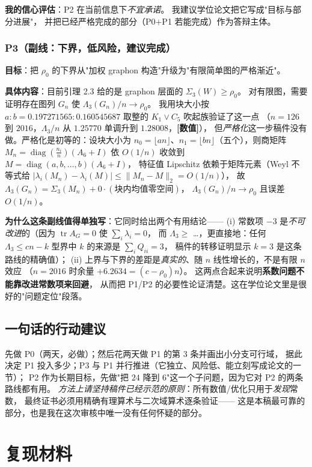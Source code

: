 \documentclass[UTF8,11pt]{ctexart}
\theoremstyle{definition}
\newcommand{\tr}{\operatorname{tr}}
\newcommand{\diag}{\operatorname{diag}}
\newcommand{\num}{\textcolor[rgb]{0.55,0.35,0.00}{\bfseries [数值]}}
\begin{document}
\textbf{我的信心评估}：P2 在当前信息下\emph{不宜承诺}。
我建议学位论文把它写成"目标与部分进展"，
并把已经严格完成的部分（P0$+$P1 若能完成）作为答辩主体。

\subsubsection*{P3（副线：下界，低风险，建议完成）}
\textbf{目标}：把 $\rho_0$ 的下界从"加权 graphon 构造"升级为"有限简单图的严格渐近"。

\textbf{具体内容}：目前引理 2.3 给的是 graphon 层面的 $\Sigma_3(W)\ge\rho_0$。
对有限图，需要证明存在图列 $G_n$ 使 $\Lambda_3(G_n)/n\to\rho_0$。
我用块大小按 $a:b=0.197271565:0.160545687$ 取整的 $K_1\vee C_5$ 吹起族验证了这一点
（$n=126$ 到 $2016$，$\Lambda_3/n$ 从 $1.25770$ 单调升到 $1.28008$，\num），
但\emph{严格化}这一步稿件没有做。严格化是初等的：设块大小为
$n_0=\lfloor an\rfloor$、$n_1=\lfloor bn\rfloor$（五个），则商矩阵
$M_n=\diag(\frac{n_i}n)(A_6+I)$ 依 $O(1/n)$ 收敛到 $M=\diag(a,b,\ldots,b)(A_6+I)$，
特征值 Lipschitz 依赖于矩阵元素（Weyl 不等式给 $|\lambda_i(M_n)-\lambda_i(M)|\le\|M_n-M\|_2=O(1/n)$），
故 $\Lambda_3(G_n)=\Sigma_3(M_n)+0\cdot(\text{块内均值零空间})$，
$\Lambda_3(G_n)/n\to\rho_0$ 且误差 $O(1/n)$。

\textbf{为什么这条副线值得单独写}：它同时给出两个有用结论——
(i) 常数项 $-3$ 是\emph{不可改进}的（因为 $\tr A_G=0$ 使 $\sum_i\lambda_i=0$，
而 $\Lambda_3\ge$ …，更直接地：任何 $\Lambda_3\le cn-k$ 型界中 $k$ 的来源是 $\sum_iQ_{ii}=3$，
稿件的转移证明显示 $k=3$ 是这条路线的精确值）；
(ii) 上界与下界的差距是\emph{真实的}、随 $n$ 线性增长的，不是有限 $n$ 效应
（$n=2016$ 时余量 $+6.2634=(c-\rho_0)n$）。
这两点合起来说明\textbf{系数问题不能靠改进常数项来回避}，
从而把 P1/P2 的必要性论证清楚。这在学位论文里是很好的"问题定位"段落。

\subsection{一句话的行动建议}

先做 P0（两天，必做）；然后花两天做 P1 的第 3 条并画出小分支可行域，
据此决定 P1 投入多少；P3 与 P1 并行推进（它独立、风险低、能立刻写成论文的一节）；
P2 作为长期目标，先做"把 $24$ 降到 $6$"这一个子问题，因为它对 P2 的两条路线都有用。
\emph{方法上请坚持稿件已经示范的原则}：所有数值/优化只用于\emph{发现}常数，
最终证书必须用精确有理算术与二次域算术逐条验证——
这是本稿最可靠的部分，也是我在这次审核中唯一没有任何怀疑的部分。

\section{复现材料}\label{sec:repro}
\end{document}
